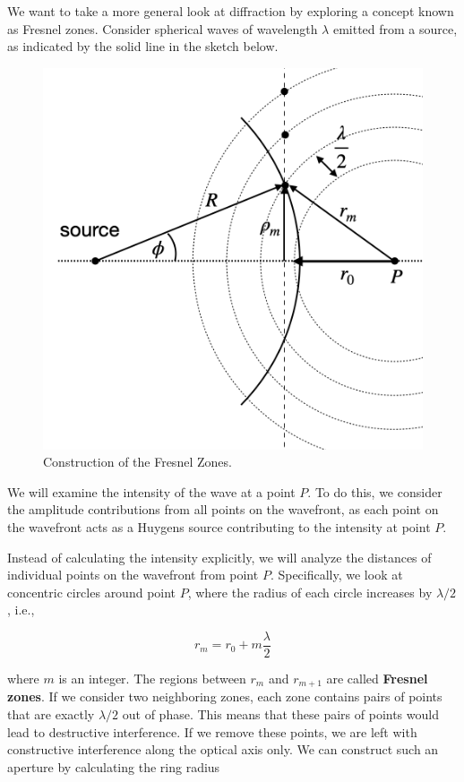 \documentclass[
  a4paper,
]{book}
\begin{document}
We want to take a more general look at diffraction by exploring a
concept known as Fresnel zones. Consider spherical waves of wavelength
\(\lambda\) emitted from a source, as indicated by the solid line in the
sketch below.

\begin{figure}[H]

{\centering \includegraphics[width=0.65\linewidth,height=\textheight,keepaspectratio]{wave-optics/img/fresnel_zones.png}

}

\caption{Construction of the Fresnel Zones.}

\end{figure}%

We will examine the intensity of the wave at a point \(P\). To do this,
we consider the amplitude contributions from all points on the
wavefront, as each point on the wavefront acts as a Huygens source
contributing to the intensity at point \(P\).

Instead of calculating the intensity explicitly, we will analyze the
distances of individual points on the wavefront from point \(P\).
Specifically, we look at concentric circles around point \(P\), where
the radius of each circle increases by \(\lambda/2\), i.e.,

\[
r_m = r_0 + m \frac{\lambda}{2}
\]

where \(m\) is an integer. The regions between \(r_m\) and \(r_{m+1}\)
are called \textbf{Fresnel zones}. If we consider two neighboring zones,
each zone contains pairs of points that are exactly \(\lambda/2\) out of
phase. This means that these pairs of points would lead to destructive
interference. If we remove these points, we are left with constructive
interference along the optical axis only. We can construct such an
aperture by calculating the ring radius
\end{document}
